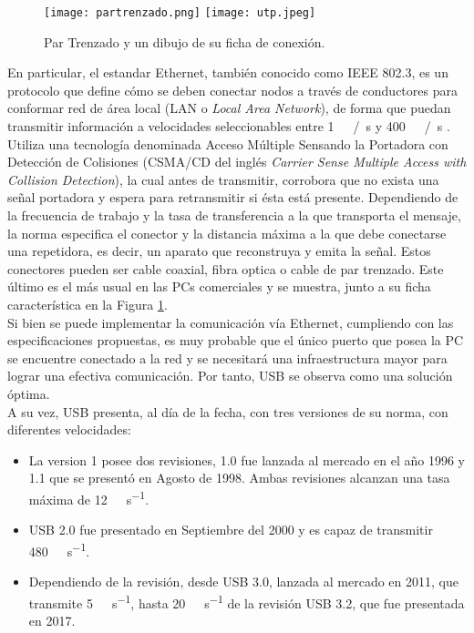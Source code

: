 \begin{figure}
	\centering
	\texttt{[image: partrenzado.png]}
	\texttt{[image: utp.jpeg]}
	\caption{Par Trenzado y un dibujo de su ficha de conexión.}
	\label{fig:utp}
\end{figure}

En particular, el estandar Ethernet, también conocido como IEEE 802.3, es un protocolo que define cómo se deben conectar nodos a través de conductores para conformar red de área local (LAN o {\it Local Area Network}), de forma que puedan transmitir información a velocidades seleccionables entre \SI{1}{\mega\bit\slash\second} y \SI{400}{\giga\bit\slash\second} \cite{Ethernet2018}. Utiliza una tecnología denominada Acceso Múltiple Sensando la Portadora con Detección de Colisiones (CSMA/CD del inglés {\it Carrier Sense Multiple Access with Collision Detection}), la cual antes de transmitir, corrobora que no exista una señal portadora y espera para retransmitir si ésta está presente. Dependiendo de la frecuencia de trabajo y la tasa de transferencia a la que transporta el mensaje, la norma especifica el conector y la distancia máxima a la que debe conectarse una repetidora, es decir, un aparato que reconstruya y emita la señal. Estos conectores pueden ser cable coaxial, fibra optica o cable de par trenzado. Este último es el más usual en las PCs comerciales y se muestra, junto a su ficha característica en la Figura \ref{fig:utp}.\\


Si bien se puede implementar la comunicación vía Ethernet, cumpliendo con las especificaciones propuestas, es muy probable que el único puerto que posea la PC se encuentre conectado a la red y se necesitará una infraestructura mayor para lograr una efectiva comunicación. Por tanto, USB se observa como una solución óptima.\\

A su vez, USB presenta, al día de la fecha, con tres versiones de su norma, con diferentes velocidades: 

\begin{itemize}
	\item La version 1 posee dos revisiones, 1.0 fue lanzada al mercado en el año 1996 y 1.1 que se presentó en Agosto de 1998. Ambas revisiones alcanzan una tasa máxima de \SI{12}{\mega\bit\per\second}. 
	\item USB 2.0 fue presentado en Septiembre del 2000 y es capaz de transmitir \SI{480}{\mega\bit\per\second}.
	\item Dependiendo de la revisión, desde USB 3.0, lanzada al mercado en 2011, que transmite \SI{5}{\giga\bit\per\second}, hasta \SI{20}{\giga\bit\per\second} de la revisión USB 3.2, que fue presentada en 2017.
\end{itemize}


